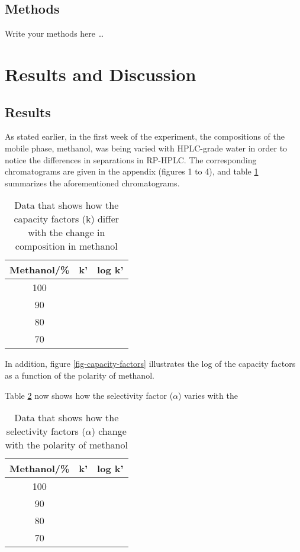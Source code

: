 \documentclass[a4paper, 12pt]{article}
\begin{document}
\subsection{Methods}
Write your methods here \dots


\section{Results and Discussion}

\subsection{Results}
As stated earlier, in the first week of the experiment, the compositions of the mobile phase, methanol, was being varied with HPLC-grade water in order to notice the differences in separations in RP-HPLC. The corresponding chromatograms are given in the appendix (figures 1 to 4), and table \ref{tab-capacity-factors} summarizes the aforementioned chromatograms.

\begin{table}[h!]
	\centering
	\begin{tabular}{|c|c|c|}
		\hline
		Methanol/\% & k' & log k' \\
		\hline
		100 & & \\
		\hline
		90 & & \\
		\hline
		80 & & \\
		\hline
		70 & & \\
		\hline
	\end{tabular}
	\caption{Data that shows how the capacity factors (k) differ with the change in composition in methanol}
	\label{tab-capacity-factors}
\end{table}

In addition, figure \ref{fig-capacity-factors} illustrates the log of the capacity factors as a function of the polarity of methanol.

Table \ref{tab-selectivity} now shows how the selectivity factor ($\alpha$) varies with the 

\begin{table}[h!]
	\centering
	\begin{tabular}{|c|c|c|}
		\hline
		Methanol/\% & k' & log k' \\
		\hline
		100 & & \\
		\hline
		90 & & \\
		\hline
		80 & & \\
		\hline
		70 & & \\
		\hline
	\end{tabular}
	\caption{Data that shows how the selectivity factors ($\alpha$) change with the polarity of methanol}
	\label{tab-selectivity}
\end{table}
\end{document}
